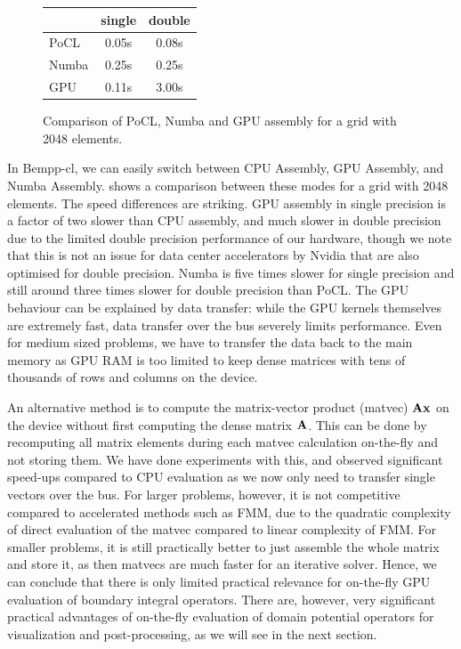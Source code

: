 \begin{figure}
\begin{center}
\begin{tabular}{l|c|c}
	        &   single      &    double\\
	        \hline
	 PoCL   &   0.05s       &    0.08s\\
	 Numba  &   0.25s       &    0.25s\\
	 GPU    &   0.11s       &    3.00s\\
\end{tabular}
\end{center}
\caption{Comparison of PoCL, Numba and GPU assembly for a grid with 2048 elements.}
\label{fig:cpu_gpu_numba_compare}
\end{figure}
In Bempp-cl, we can easily switch between CPU Assembly, GPU Assembly, and Numba Assembly.  shows a comparison between these modes for a grid with 2048 elements. The speed differences are striking. GPU assembly in single precision is a factor of two slower than CPU assembly, and much slower in double precision due to the limited double precision performance of our hardware, though we note that this is not an issue for data center accelerators by Nvidia that are also optimised for double precision. Numba is five times slower for single precision and still around three times slower for double precision than PoCL. The GPU behaviour can be explained by data transfer: while the GPU kernels themselves are extremely fast, data transfer over the bus severely limits performance. Even for medium sized problems, we have to transfer the data back to the main memory as GPU RAM is too limited to keep dense matrices with tens of thousands of rows and columns on the device.

An alternative method is to compute the matrix-vector product (matvec) $\mathbf{A}\mathbf{x}$ on the device without first computing the dense matrix $\mathbf{A}$. This can be done by recomputing all matrix elements during each matvec calculation on-the-fly and not storing them. We have done experiments with this, and observed significant speed-ups compared to CPU evaluation as we now only need to transfer single vectors over the bus. For larger problems, however, it is not competitive compared to accelerated methods such as FMM, due to the quadratic complexity of direct evaluation of the matvec compared to linear complexity of FMM. For smaller problems, it is still practically better to just assemble the whole matrix and store it, as then matvecs are much faster for an iterative solver. Hence, we can conclude that there is only limited practical relevance for on-the-fly GPU evaluation of boundary integral operators. There are, however, very significant practical advantages of on-the-fly evaluation of domain potential operators for visualization and post-processing, as we will see in the next section.

